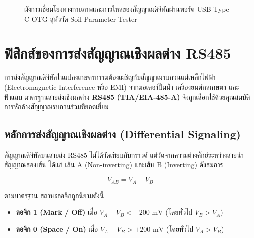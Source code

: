 \begin{figure}[H]
\caption{ผังการเชื่อมโยงทางกายภาพและการไหลของสัญญาณดิจิทัลผ่านพอร์ต USB Type-C OTG สู่หัววัด Soil Parameter Tester}
\label{fig:ch02_hardware_interconnect}
\end{figure}

\section{ฟิสิกส์ของการส่งสัญญาณเชิงผลต่าง RS485}

การส่งสัญญาณดิจิทัลในแปลงเกษตรกรรมต้องเผชิญกับสัญญาณรบกวนแม่เหล็กไฟฟ้า (Electromagnetic Interference หรือ EMI) จากมอเตอร์ปั๊มน้ำ เครื่องยนต์กลเกษตร และฟ้าแลบ มาตรฐานสายส่งเชิงผลต่าง \textbf{RS485 (TIA/EIA-485-A)} จึงถูกเลือกใช้ด้วยคุณสมบัติการหักล้างสัญญาณรบกวนร่วมที่ยอดเยี่ยม

\subsection{หลักการส่งสัญญาณเชิงผลต่าง (Differential Signaling)}
สัญญาณดิจิทัลบนสายส่ง RS485 ไม่ได้วัดเทียบกับกราวด์ แต่วัดจากความต่างศักย์ระหว่างสายนำสัญญาณสองเส้น ได้แก่ เส้น A (Non-inverting) และเส้น B (Inverting) ดังสมการ

\begin{equation}
V_{AB} = V_A - V_B
\end{equation}

ตามมาตรฐาน สถานะลอจิกถูกนิยามดังนี้
\begin{itemize}
    \item \textbf{ลอจิก 1 (Mark / Off)} เมื่อ $V_A - V_B < -200 \text{ mV}$ (โดยทั่วไป $V_B > V_A$)
    \item \textbf{ลอจิก 0 (Space / On)} เมื่อ $V_A - V_B > +200 \text{ mV}$ (โดยทั่วไป $V_A > V_B$)
\end{itemize}

